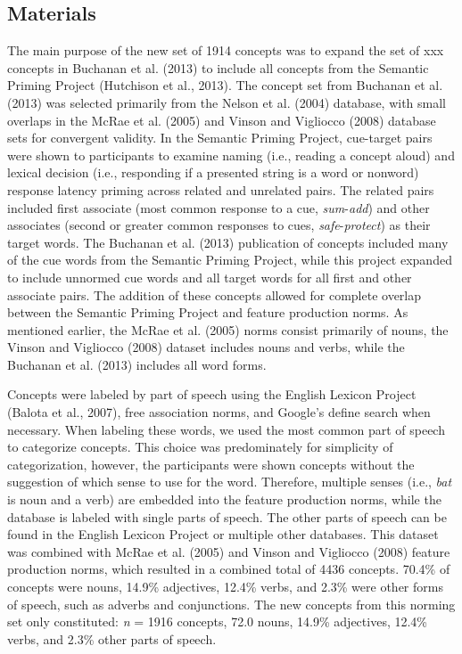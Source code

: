 \documentclass[english,,man]{apa6}
\begin{document}
\hypertarget{materials}{%
\subsection{Materials}\label{materials}}

The main purpose of the new set of 1914 concepts was to expand the set of xxx concepts in Buchanan et al. (2013) to include all concepts from the Semantic Priming Project (Hutchison et al., 2013). The concept set from Buchanan et al. (2013) was selected primarily from the Nelson et al. (2004) database, with small overlaps in the McRae et al. (2005) and Vinson and Vigliocco (2008) database sets for convergent validity. In the Semantic Priming Project, cue-target pairs were shown to participants to examine naming (i.e., reading a concept aloud) and lexical decision (i.e., responding if a presented string is a word or nonword) response latency priming across related and unrelated pairs. The related pairs included first associate (most common response to a cue, \emph{sum}-\emph{add}) and other associates (second or greater common responses to cues, \emph{safe}-\emph{protect}) as their target words. The Buchanan et al. (2013) publication of concepts included many of the cue words from the Semantic Priming Project, while this project expanded to include unnormed cue words and all target words for all first and other associate pairs. The addition of these concepts allowed for complete overlap between the Semantic Priming Project and feature production norms. As mentioned earlier, the McRae et al. (2005) norms consist primarily of nouns, the Vinson and Vigliocco (2008) dataset includes nouns and verbs, while the Buchanan et al. (2013) includes all word forms.

Concepts were labeled by part of speech using the English Lexicon Project (Balota et al., 2007), free association norms, and Google's define search when necessary. When labeling these words, we used the most common part of speech to categorize concepts. This choice was predominately for simplicity of categorization, however, the participants were shown concepts without the suggestion of which sense to use for the word. Therefore, multiple senses (i.e., \emph{bat} is noun and a verb) are embedded into the feature production norms, while the database is labeled with single parts of speech. The other parts of speech can be found in the English Lexicon Project or multiple other databases. This dataset was combined with McRae et al. (2005) and Vinson and Vigliocco (2008) feature production norms, which resulted in a combined total of 4436 concepts. 70.4\% of concepts were nouns, 14.9\% adjectives, 12.4\% verbs, and 2.3\% were other forms of speech, such as adverbs and conjunctions. The new concepts from this norming set only constituted: \emph{n} = 1916 concepts, 72.0 nouns, 14.9\% adjectives, 12.4\% verbs, and 2.3\% other parts of speech.
\end{document}
